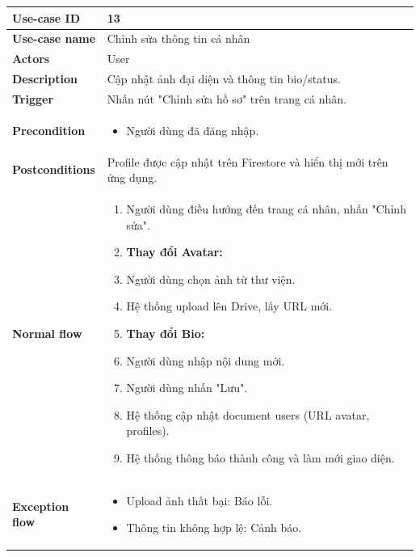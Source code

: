 \documentclass[a4paper, 12pt]{article}
\begin{document}
	\begin{longtable}{|p{3.5cm}|p{12cm}|}
		\hline
		\textbf{Use-case ID} & 13 \\
		\hline
		\textbf{Use-case name} & Chỉnh sửa thông tin cá nhân \\
		\hline
		\textbf{Actors} & User \\
		\hline
		\textbf{Description} & Cập nhật ảnh đại diện và thông tin bio/status. \\
		\hline
		\textbf{Trigger} & Nhấn nút "Chỉnh sửa hồ sơ" trên trang cá nhân. \\
		\hline
		\textbf{Precondition} & 
		\begin{itemize}[label=+]
			\item Người dùng đã đăng nhập.
		\end{itemize} \\
		\hline
		\textbf{Postconditions} & Profile được cập nhật trên Firestore và hiển thị mới trên ứng dụng. \\
		\hline
		\textbf{Normal flow} & 
		\begin{enumerate}
			\item Người dùng điều hướng đến trang cá nhân, nhấn "Chỉnh sửa".
			\item[] \textbf{Thay đổi Avatar:}
			\item Người dùng chọn ảnh từ thư viện.
			\item Hệ thống upload lên Drive, lấy URL mới.
			\item[] \textbf{Thay đổi Bio:}
			\item Người dùng nhập nội dung mới.
			\item Người dùng nhấn "Lưu".
			\item Hệ thống cập nhật document users (URL avatar, profiles).
			\item Hệ thống thông báo thành công và làm mới giao diện.
		\end{enumerate} \\
		\hline
		\textbf{Exception flow} & 
		\begin{itemize}[label={*}]
			\item Upload ảnh thất bại: Báo lỗi.
			\item Thông tin không hợp lệ: Cảnh báo.
		\end{itemize} \\
		\hline
	\end{longtable}
	\vspace{0.5cm}
	
\end{document}
